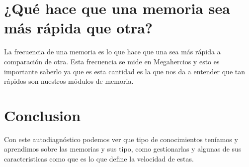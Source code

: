 \documentclass{article}
\begin{document}
\section{¿Qué hace que una memoria sea más rápida que otra?} La frecuencia de una memoria es lo que hace que una sea más rápida a comparación de otra. Esta frecuencia se mide en Megahercios y esto es importante saberlo ya que es esta cantidad es la que nos da a entender que tan rápidos son nuestros módulos de memoria.

\section{Conclusion}\label{Conclusion} Con este autodiagnóstico podemos ver que tipo de conocimientos teníamos y aprendimos sobre las memorias y sus tipo, como gestionarlas y algunas de sus caracteristicas como que es lo que define la velocidad de estas.



\end{document}
